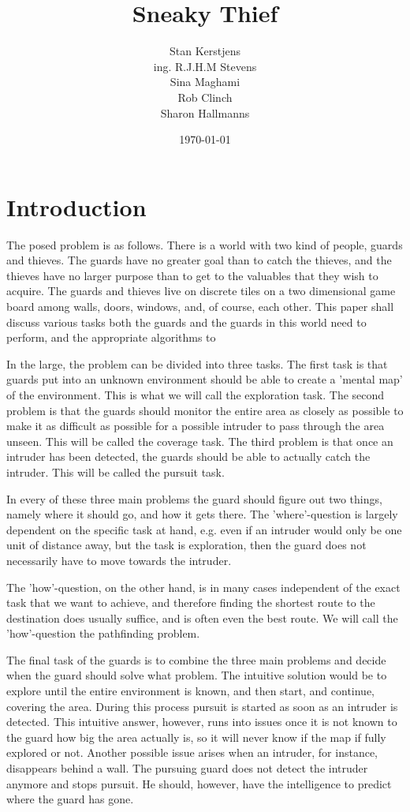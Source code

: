 \documentclass{apa6}
\title{Sneaky Thief}
\author{Stan Kerstjens\\ing. R.J.H.M Stevens\\Sina Maghami\\Rob Clinch\\Sharon Hallmanns}
\date{\today}
\affiliation{Department of Knowledge Engineering, \\Maastricht University}
\begin{document}
\maketitle
\section{Introduction}
The posed problem is as follows. There is a world with two kind of people, guards and thieves. The guards have no greater goal than to catch the thieves, and the thieves have no larger purpose than to get to the valuables that they wish to acquire. The guards and thieves live on discrete tiles on a two dimensional game board among walls, doors, windows, and, of course, each other. This paper shall discuss various tasks both the guards and the guards in this world need to perform, and the appropriate algorithms to 

	In the large, the problem  can be divided into three tasks. The first task is that guards put into an unknown environment should be able to create a 'mental map' of the environment. This is what we will call the exploration task. The second problem is that the guards should monitor the entire area as closely as possible to make it as difficult as possible for a possible intruder to pass through the area unseen. This will be called the coverage task. The third problem is that once an intruder has been detected, the guards should be able to actually catch the intruder. This will be called the pursuit task.

	In every of these three main problems the guard should figure out two things, namely where it should go, and how it gets there. The 'where'-question is largely dependent on the specific task at hand, e.g. even if an intruder would only be one unit of distance away, but the task is exploration, then the guard does not necessarily have to move towards the intruder.

	The 'how'-question, on the other hand, is in many cases independent of the exact task that we want to achieve, and therefore finding the shortest route to the destination does usually suffice, and is often even the best route. We will call the 'how'-question the pathfinding problem.

	The final task of the guards is to combine the three main problems and decide when the guard should solve what problem. The intuitive solution would be to explore until the entire environment is known, and then start, and continue, covering the area. During this process pursuit is started as soon as an intruder is detected. This intuitive answer, however, runs into issues once it is not known to the guard how big the area actually is, so it will never know if the map if fully explored or not. Another possible issue arises when an intruder, for instance, disappears behind a wall. The pursuing guard does not detect the intruder anymore and stops pursuit. He should, however, have the intelligence to predict where the guard has gone.
	
\end{document}
